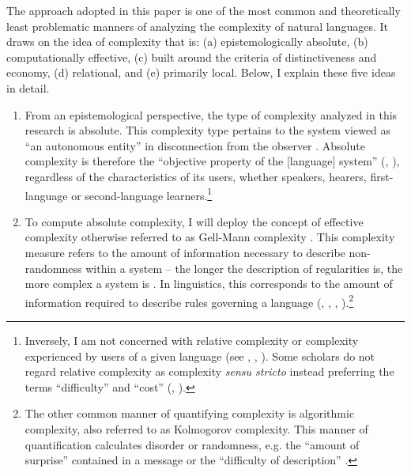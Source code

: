 \documentclass[output=paper,hidelinks]{langscibook}
\begin{document}
The approach adopted in this paper is one of the most common and theoretically least problematic manners of analyzing the complexity of natural languages. It draws on the idea of complexity that is:
(a) epistemologically absolute,
(b) computationally effective,
(c) built around the criteria of distinctiveness and economy,
(d) relational, and
(e) primarily local.
Below, I explain these five ideas in detail.

\begin{enumerate}

\item From an epistemological perspective, the type of complexity analyzed in this research is absolute. This complexity type pertains to the system viewed as ``an autonomous entity'' in disconnection from the observer \citep[4]{kusters_complexity_2008}. Absolute complexity is therefore the ``objective property of the [language] system'' (\citealt[23]{miestamo_grammatical_2008}, \citealt{dahl_growth_2004}), regardless of the characteristics of its users, whether speakers, hearers, first-language or second-language learners.\footnote{Inversely, I am not concerned with relative complexity or complexity experienced by users of a given language (see \citealt{kusters_linguistic_2003}, \citealt[23]{miestamo_grammatical_2008}, \citeyear[81--82]{miestamo_implicational_2009}). Some scholars do not regard relative complexity as complexity \textit{sensu stricto} \citep[39--40]{dahl_growth_2004} instead preferring the terms ``difficulty'' and ``cost'' (\citealt[27]{miestamo_grammatical_2008}, \citealt{lindstrom_language_2008}).}

\item To compute absolute complexity, I will deploy the concept of effective complexity otherwise referred to as Gell-Mann complexity \citep{gell-mann_what_1995, gell-mann_effective_2004}. This complexity measure refers to the amount of information necessary to describe non-randomness within a system – the longer the description of regularities is, the more complex a system is \citep[99]{mitchell_complexity_2009}. In linguistics, this corresponds to the amount of information required to describe rules governing a language (\citealt{mcwhorter_defining_2005, mcwhorter_language_2007, mcwhorter_oh_2009}, \citealt[25]{miestamo_grammatical_2008}, \citeyear[81--82]{miestamo_implicational_2009}, \citealt{sinnemaki_complexity_2008, sinnemaki_complexity_2009, sinnemaki_language_2011, parkvall_simplicity_2008}).\footnote{The other common manner of quantifying complexity is algorithmic complexity, also referred to as Kolmogorov complexity. This manner of quantification calculates disorder or randomness, e.g. the ``amount of surprise'' contained in a message \citep[97--98]{mitchell_complexity_2009} or the ``difficulty of description'' \citep[52]{shalizi_methods_2006}.}


\end{enumerate}
\end{document}
